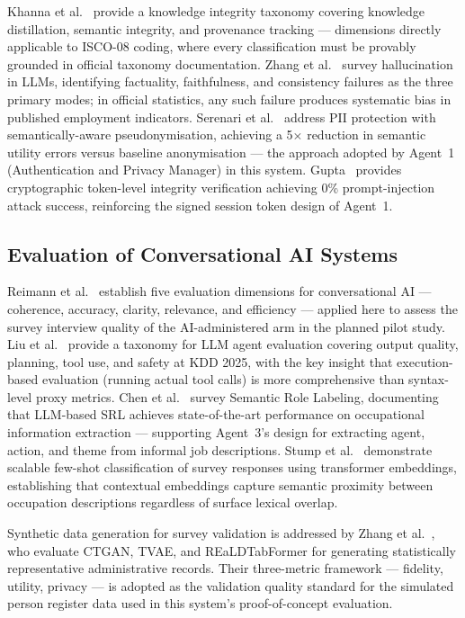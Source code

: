 Khanna et al.~\cite{khanna2025knowledge} provide a knowledge integrity taxonomy
covering knowledge distillation, semantic integrity, and provenance tracking ---
dimensions directly applicable to ISCO-08 coding, where every classification
must be provably grounded in official taxonomy documentation.
Zhang et al.~\cite{zhang2025hallucination} survey hallucination in LLMs,
identifying factuality, faithfulness, and consistency failures as the three
primary modes; in official statistics, any such failure produces systematic
bias in published employment indicators.
Serenari et al.~\cite{serenari2025lopsided} address PII protection with
semantically-aware pseudonymisation, achieving a 5$\times$ reduction in
semantic utility errors versus baseline anonymisation --- the approach adopted
by Agent~1 (Authentication and Privacy Manager) in this system.
Gupta~\cite{gupta2025civ} provides cryptographic token-level integrity
verification achieving 0\% prompt-injection attack success, reinforcing the
signed session token design of Agent~1.

\subsection{Evaluation of Conversational AI Systems}

Reimann et al.~\cite{reimann2025conveval} establish five evaluation dimensions
for conversational AI --- coherence, accuracy, clarity, relevance, and efficiency
--- applied here to assess the survey interview quality of the AI-administered
arm in the planned pilot study.
Liu et al.~\cite{liu2025agenteval} provide a taxonomy for LLM agent evaluation
covering output quality, planning, tool use, and safety at KDD 2025, with
the key insight that execution-based evaluation (running actual tool calls)
is more comprehensive than syntax-level proxy metrics.
Chen et al.~\cite{chen2025srl} survey Semantic Role Labeling, documenting
that LLM-based SRL achieves state-of-the-art performance on occupational
information extraction --- supporting Agent~3's design for extracting agent,
action, and theme from informal job descriptions.
Stump et al.~\cite{stump2025embedding} demonstrate scalable few-shot
classification of survey responses using transformer embeddings, establishing
that contextual embeddings capture semantic proximity between occupation
descriptions regardless of surface lexical overlap.

Synthetic data generation for survey validation is addressed by Zhang et
al.~\cite{zhang2025synthetic}, who evaluate CTGAN, TVAE, and REaLDTabFormer
for generating statistically representative administrative records.
Their three-metric framework --- fidelity, utility, privacy --- is adopted
as the validation quality standard for the simulated person register data
used in this system's proof-of-concept evaluation.

